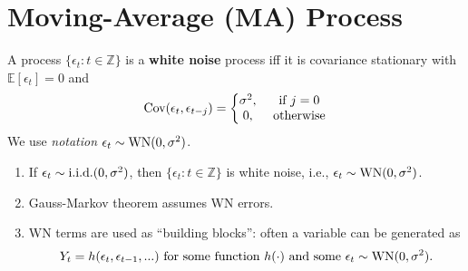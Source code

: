 \documentclass[11pt]{elegantbook}
\begin{document}
\section{Moving-Average (MA) Process}
\begin{definition}
    A process $\{\epsilon_t:t\in \mathbb{Z}\}$ is a \textbf{white noise} process iff it is covariance stationary with $\mathbb{E}[\epsilon_t]=0$ and
    \begin{equation}
        \begin{aligned}
            \textnormal{Cov}(\epsilon_t,\epsilon_{t-j})=\left\{\begin{matrix}
                \sigma^2,& \textnormal{ if }j=0\\
                0,& \textnormal{ otherwise}
            \end{matrix}\right.
        \end{aligned}
        \nonumber
    \end{equation}
    We use \textit{notation} $\epsilon_t\sim \textnormal{WN}(0,\sigma^2)$.
\end{definition}
\begin{note}
    \begin{enumerate}
        \item If $\epsilon_t\sim \textnormal{i.i.d.}(0,\sigma^2)$, then $\{\epsilon_t:t\in \mathbb{Z}\}$ is white noise, i.e., $\epsilon_t\sim \textnormal{WN}(0,\sigma^2)$.
        \item Gauss-Markov theorem assumes WN errors.
        \item WN terms are used as ``building blocks'': often a variable can be generated as
        \begin{equation}
            \begin{aligned}
                Y_t=h(\epsilon_t,\epsilon_{t-1},...) \textnormal{ for some function $h(\cdot)$ and some $\epsilon_t\sim \textnormal{WN}(0,\sigma^2)$.}
            \end{aligned}
            \nonumber
        \end{equation}
    \end{enumerate}
\end{note}
\end{document}
